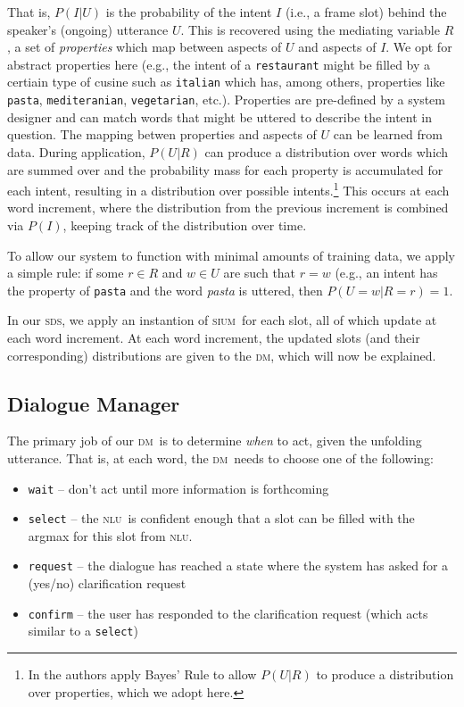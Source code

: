 \documentclass[11pt]{article}
\newcommand{\sds}[0]{\textsc{sds}}
\newcommand{\nlu}[0]{\textsc{nlu}}
\newcommand{\sium}[0]{\textsc{sium}}
\newcommand{\dm}[0]{\textsc{dm}}
\begin{document}
That is, $P(I|U)$ is the probability of the intent $I$ (i.e., a frame slot) behind the speaker's (ongoing) utterance $U$. This is recovered using the mediating variable $R$, a set of \emph{properties} which map between aspects of $U$ and aspects of $I$. We opt for abstract properties here (e.g., the intent of a \texttt{restaurant} might be filled by a certiain type of cusine such as \texttt{italian} which has, among others, properties like \texttt{pasta}, \texttt{mediteranian}, \texttt{vegetarian}, etc.). Properties are pre-defined by a system designer and can match words that might be uttered to describe the intent in question. The mapping betwen properties and aspects of $U$ can be learned from data. During application, $P(U|R)$ can produce a distribution over words which are summed over and the probability mass for each property is accumulated for each intent, resulting in a distribution over possible intents.\footnote{In  the authors apply Bayes' Rule to allow $P(U|R)$ to produce a distribution over properties, which we adopt here.} This occurs at each word increment, where the distribution from the previous increment is combined via $P(I)$, keeping track of the distribution over time. 

To allow our system to function with minimal amounts of training data, we apply a simple rule: if some $r \in R$ and $w \in U$ are such that $r=w$ (e.g., an intent has the property of \texttt{pasta} and the word \emph{pasta} is uttered, then $P(U=w|R=r) = 1$.

In our \sds, we apply an instantion of \sium\ for each slot, all of which update at each word increment. At each word increment, the updated slots (and their corresponding) distributions are given to the \dm, which will now be explained. 

\subsection{Dialogue Manager}

The primary job of our \dm\ is to determine \emph{when} to act, given the unfolding utterance. That is, at each word, the \dm\ needs to choose one of the following:
\begin{itemize}
 \item \texttt{wait} -- don't act until more information is forthcoming
 \item \texttt{select} -- the \nlu\ is confident enough that a slot can be filled with the argmax for this slot from \nlu.
 \item \texttt{request} -- the dialogue has reached a state where the system has asked for a (yes/no) clarification request
 \item \texttt{confirm} -- the user has responded to the clarification request (which acts similar to a \texttt{select})
\end{itemize}
\end{document}
